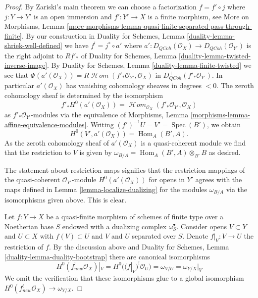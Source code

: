 \documentclass[10pt,a4paper]{amsart}
\theoremstyle{plain}
\theoremstyle{definition}
\theoremstyle{remark}
\numberwithin{equation}{subsection}
\def\Spec{\mathop{\mathrm{Spec}}}
\def\Hom{\mathop{\mathrm{Hom}}\nolimits}
\def\SheafHom{\mathop{\mathcal{H}\!\mathit{om}}\nolimits}
\def\QCoh{\mathit{QCoh}}
\begin{document}
\begin{proof}
By Zariski's main theorem we can choose a factorization $f = f' \circ j$
where $j : Y \to Y'$ is an open immersion and $f' : Y' \to X$ is a finite
morphism, see More on Morphisms, Lemma
\ref{more-morphisms-lemma-quasi-finite-separated-pass-through-finite}.
By our construction in
Duality for Schemes, Lemma \ref{duality-lemma-shriek-well-defined} we have
$f^! = j^* \circ a'$ where
$a' : D_\QCoh(\mathcal{O}_X) \to D_\QCoh(\mathcal{O}_{Y'})$
is the right adjoint to $Rf'_*$ of
Duality for Schemes, Lemma \ref{duality-lemma-twisted-inverse-image}.
By Duality for Schemes, Lemma \ref{duality-lemma-finite-twisted}
we see that
$\Phi(a'(\mathcal{O}_X)) = R\SheafHom(f'_*\mathcal{O}_{Y'}, \mathcal{O}_X)$ in
$D_\QCoh^+(f'_*\mathcal{O}_{Y'})$. In particular $a'(\mathcal{O}_X)$ has
vanishing cohomology sheaves in degrees $< 0$. The zeroth cohomology sheaf
is determined by the isomorphism
$$
f'_*H^0(a'(\mathcal{O}_X)) =
\SheafHom_{\mathcal{O}_X}(f'_*\mathcal{O}_{Y'}, \mathcal{O}_X)
$$
as $f'_*\mathcal{O}_{Y'}$-modules via the equivalence of
Morphisms, Lemma \ref{morphisms-lemma-affine-equivalence-modules}.
Writing $(f')^{-1}U = V' = \Spec(B')$, we obtain
$$
H^0(V', a'(\mathcal{O}_X)) = \Hom_A(B', A).
$$
As the zeroth cohomology sheaf of $a'(\mathcal{O}_X)$
is a quasi-coherent module we find that
the restriction to $V$ is given by
$\omega_{B/A} = \Hom_A(B', A) \otimes_{B'} B$ as desired.

\medskip\noindent
The statement about restriction maps signifies that the restriction mappings
of the quasi-coherent $\mathcal{O}_{Y'}$-module $H^0(a'(\mathcal{O}_X))$
for opens in $Y'$ agrees with the maps defined in
Lemma \ref{lemma-localize-dualizing}
for the modules $\omega_{B/A}$ via the isomorphisms given above.
This is clear.

\medskip\noindent
Let $f : Y \to X$ be a quasi-finite morphism of schemes of finite type
over a Noetherian base $S$ endowed with a dualizing complex $\omega_S^\bullet$.
Consider opens $V \subset Y$ and $U \subset X$ with $f(V) \subset U$
and $V$ and $U$ separated over $S$. Denote $f|_V : V \to U$ the restriction
of $f$. By the discussion above and
Duality for Schemes, Lemma \ref{duality-lemma-duality-bootstrap}
there are canonical isomorphisms
$$
H^0(f_{new}^!\mathcal{O}_X)|_V = H^0((f|_V)^!\mathcal{O}_U) = \omega_{V/U} =
\omega_{Y/X}|_V
$$
We omit the verification that these isomorphisms glue to a global
isomorphism $H^0(f_{new}^!\mathcal{O}_X) \to \omega_{Y/X}$.
\end{proof}
\end{document}
